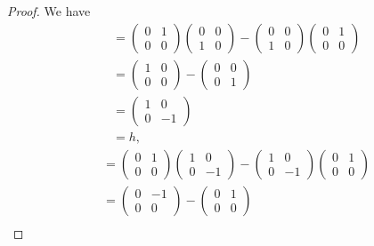 \documentclass[12pt]{article}
\theoremstyle{definition}
\begin{document}
\begin{proof}
	We have \begin{align*}
		[e, f] & = \begin{pmatrix} 0 & 1 \\ 0 & 0 \end{pmatrix}\begin{pmatrix} 0 & 0 \\ 1 & 0 \end{pmatrix} - \begin{pmatrix} 0 & 0 \\ 1 & 0 \end{pmatrix}\begin{pmatrix} 0 & 1 \\ 0 & 0 \end{pmatrix} \\
		       & = \begin{pmatrix} 1 & 0 \\ 0 & 0 \end{pmatrix} - \begin{pmatrix} 0 & 0 \\ 0 & 1 \end{pmatrix}                                                                                         \\
		       & = \begin{pmatrix} 1 & 0 \\ 0 & -1 \end{pmatrix}                                                                                                                                       \\
		       & = h,
	\end{align*}
	\begin{align*}
		[e, h] & = \begin{pmatrix} 0 & 1 \\ 0 & 0 \end{pmatrix}\begin{pmatrix} 1 & 0 \\ 0 & -1 \end{pmatrix} - \begin{pmatrix} 1 & 0 \\ 0 & -1 \end{pmatrix}\begin{pmatrix} 0 & 1 \\ 0 & 0 \end{pmatrix} \\
		       & = \begin{pmatrix} 0 & -1 \\ 0 & 0 \end{pmatrix} - \begin{pmatrix} 0 & 1 \\ 0 & 0 \end{pmatrix}                                                                                          \\

\end{align*}
\end{proof}
\end{document}
